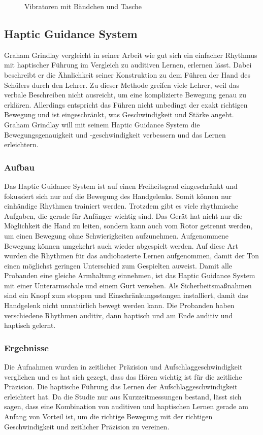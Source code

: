 \documentclass[ngerman,runningheads,a4paper]{llncs}
\begin{document}
\begin{figure}
\begin{minipage}[b]{0.4\textwidth}
    \caption{Vibratoren mit Bändchen und Tasche \cite{10.1145/1709886.1709892}}
  \end{minipage}
\end{figure}

\subsection{Haptic Guidance System}
Graham Grindlay \cite{4479984} vergleicht in seiner Arbeit wie gut sich ein einfacher Rhythmus mit haptischer Führung im Vergleich zu auditiven Lernen, erlernen lässt.
Dabei beschreibt er die Ähnlichkeit seiner Konstruktion zu dem Führen der Hand des Schülers durch den Lehrer.
Zu dieser Methode greifen viele Lehrer, weil das verbale Beschreiben nicht ausreicht, um eine komplizierte Bewegung genau zu erklären.
Allerdings entspricht das Führen nicht unbedingt der exakt richtigen Bewegung und ist eingeschränkt, was Geschwindigkeit und Stärke angeht.
Graham Grindlay will mit seinem Haptic Guidance System die Bewegungsgenauigkeit und -geschwindigkeit verbessern und das Lernen erleichtern.

\subsubsection{Aufbau}
Das Haptic Guidance System ist auf einen Freiheitsgrad eingeschränkt und fokussiert sich nur auf die Bewegung des Handgelenks.
Somit können nur einhändige Rhythmen trainiert werden.
Trotzdem gibt es viele rhythmische Aufgaben, die gerade für Anfänger wichtig sind.
Das Gerät hat nicht nur die Möglichkeit die Hand zu leiten, sondern kann auch vom Rotor getrennt werden, um einen Bewegung ohne Schwierigkeiten aufzunehmen.
Aufgenommene Bewegung können umgekehrt auch wieder abgespielt werden.
Auf diese Art wurden die Rhythmen für das audiobasierte Lernen aufgenommen, damit der Ton einen möglichst geringen Unterschied zum Gespielten auweist.
Damit alle Probanden eine gleiche Armhaltung einnehmen, ist das Haptic Guidance System mit einer Unterarmschale und einem Gurt versehen.
Als Sicherheitsmaßnahmen sind ein Knopf zum stoppen und Einschränkungsstangen installiert, damit das Handgelenk nicht unnatürlich bewegt werden kann.
Die Probanden haben verschiedene Rhythmen auditiv, dann haptisch und am Ende auditiv und haptisch gelernt.


\subsubsection{Ergebnisse}
Die Aufnahmen wurden in zeitlicher Präzision und Aufschlaggeschwindigkeit verglichen und es hat sich gezegt, dass das Hören wichtig ist für die zeitliche Präzision.
Die haptische Führung das Lernen der Aufschlaggeschwindigkeit erleichtert hat.
Da die Studie nur aus Kurzzeitmessungen bestand, lässt sich sagen, dass eine Kombination von auditiven und haptischen Lernen gerade am Anfang von Vorteil ist, um die richtige Bewegung mit der richtigen Geschwindigkeit und zeitlicher Präzision zu vereinen.
\end{document}
